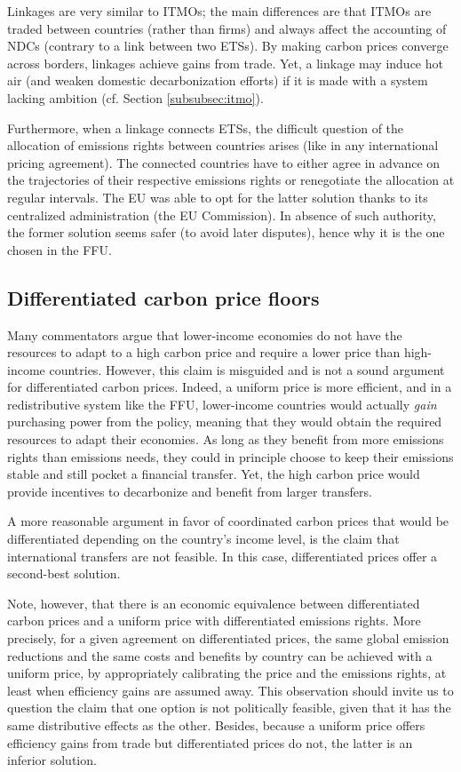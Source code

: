 \documentclass[12pt,english]{article}
\begin{document}
Linkages are very similar to ITMOs; the main differences are that ITMOs are traded between countries (rather than firms) and always affect the accounting of NDCs (contrary to a link between two ETSs). By making carbon prices converge across borders, linkages achieve gains from trade. Yet, a linkage may induce hot air (and weaken domestic decarbonization efforts) if it is made with a system lacking ambition (cf. Section \ref{subsubsec:itmo}). 

Furthermore, when a linkage connects ETSs, the difficult question of the allocation of emissions rights between countries arises (like in any international pricing agreement). The connected countries have to either agree in advance on the trajectories of their respective emissions rights or renegotiate the allocation at regular intervals. The EU was able to opt for the latter solution thanks to its centralized administration (the EU Commission). In absence of such authority, the former solution seems safer (to avoid later disputes), hence why it is the one chosen in the FFU.

\subsection{Differentiated carbon price floors}

Many commentators argue that lower-income economies do not have the resources to adapt to a high carbon price and require a lower price than high-income countries. However, this claim is misguided and is not a sound argument for differentiated carbon prices.\citep{aldy_promise_2012} Indeed, a uniform price is more efficient, and in a redistributive system like the FFU, lower-income countries would actually \textit{gain} purchasing power from the policy, meaning that they would obtain the required resources to adapt their economies. As long as they benefit from more emissions rights than emissions needs, they could in principle choose to keep their emissions stable and still pocket a financial transfer. Yet, the high carbon price would provide incentives to decarbonize and benefit from larger transfers. 

A more reasonable argument in favor of coordinated carbon prices that would be differentiated depending on the country's income level,\citep{parry_proposal_2021} is the claim that international transfers are not feasible. In this case, differentiated prices offer a second-best solution. 

Note, however, that there is an economic equivalence between differentiated carbon prices and a uniform price with differentiated emissions rights. More precisely, for a given agreement on differentiated prices, the same global emission reductions and the same costs and benefits by country can be achieved with a uniform price, by appropriately calibrating the price and the emissions rights, at least when efficiency gains are assumed away. This observation should invite us to question the claim that one option is not politically feasible, given that it has the same distributive effects as the other. Besides, because a uniform price offers efficiency gains from trade but differentiated prices do not, the latter is an inferior solution.
\end{document}
